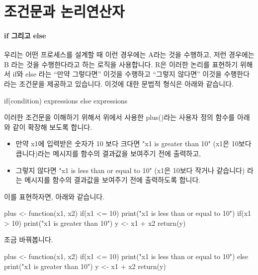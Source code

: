 \section{조건문과 논리연산자}

\paragraph{if 그리고 else} 
우리는 어떤 프로세스를 설계할 때 이런 경우에는 A라는 것을 수행하고, 저런 경우에는 B 라는 것을 수행한다라고 하는 로직을 사용합니다. 
R은 이러한 논리를 표현하기 위해서 if와 else 라는 ``만약 그렇다면'' 이것을 수행하고 ``그렇지 않다면'' 이것을 수행한다라는 조건문을 제공하고 있습니다.  
이것에 대한 문법적 형식은 아래와 같습니다. 

\begin{Schunk}
\begin{Soutput}
if(condition){
	expressions
}
else {
	expressions
}
\end{Soutput}
\end{Schunk}

이러한 조건문을 이해하기 위해서 위에서 사용한 plus()라는 사용자 정의 함수를 아래와 같이 확장해 보도록 합니다. 

\begin{itemize}
	\item 만약 x1에 입력받은 숫자가 10 보다 크다면 "x1 is greater than 10" (x1은 10보다 큽니다)라는 메시지를 함수의 결과값을 보여주기 전에 출력하고, 
	\item 그렇지 않다면 "x1 is less than or equal to 10" (x1은 10보다 작거나 같습니다) 라는 메시지를 함수의 결과값을 보여주기 전에 출력하도록 합니다.
\end{itemize}

이를 표현하자면, 아래와 같습니다. 

\begin{Schunk}
\begin{Soutput}
plus <- function(x1, x2){
	if(x1 <= 10) print("x1 is less than or equal to 10")
	if(x1 > 10) print("x1 is greater than 10")
	y <- x1 + x2
	return(y)
}
\end{Soutput}
\end{Schunk}

조금 바꿔봅니다. 

\begin{Schunk}
\begin{Soutput}
plus <- function(x1, x2){
	if(x1 <= 10) print("x1 is less than or equal to 10")
	else print("x1 is greater than 10")
	y <- x1 + x2
	return(y)
}
\end{Soutput}
\end{Schunk}


